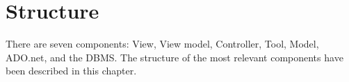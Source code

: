 \section{Structure}
There are seven components: View, View model, Controller, Tool, Model, ADO.net, and the DBMS. The structure of the most relevant components have been described in this chapter.
 





